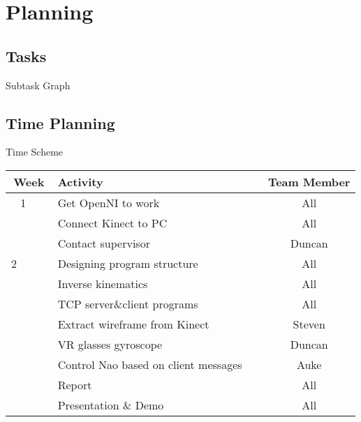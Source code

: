 \documentclass{beamer}
\begin{document}
\section{Planning}
\subsection{Tasks}
\begin{frame}{Subtask Graph}
\footnotesize
{}
\normalsize

\end{frame}

\subsection{Time Planning}

\begin{frame}{Time Scheme}
\begin{tabular}{|c|l|c|}
\hline
Week & Activity & Team Member\\
\hline
1  & Get OpenNI to work       & All\\
  & Connect Kinect to PC       & All\\
  & Contact supervisor         & Duncan\\
\hline 
2   
  & Designing program structure     & All \\
  & Inverse kinematics         & All \\
  & TCP server\&client programs     & All \\
  & Extract wireframe from Kinect     & Steven\\
  & VR glasses gyroscope       & Duncan\\
  & Control Nao based on client messages   & Auke \\
  & Report & All \\
\hline\hline
  & Presentation \& Demo        & All\\
\hline
\end{tabular}
\end{frame}
\end{document}
